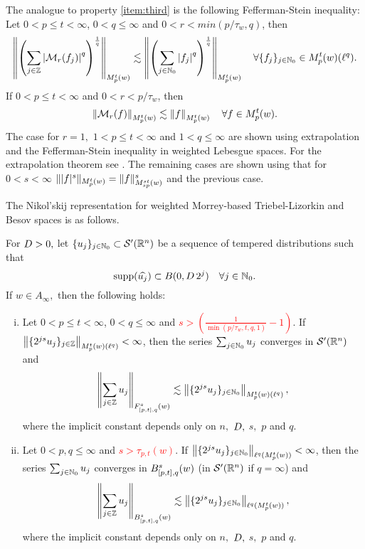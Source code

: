{{{{{{The analogue to property \ref{item:third} is the following Fefferman-Stein inequality:
Let $0<p\leq t<\infty$, $0<q\leq\infty$ and $0<r<min(p/\tau_w,q)$, then
\begin{equation}\label{eq:FTMorrey}
\norm{\left(\sum_{j\in\ent} \abs{\M_r(f_j)}^q\right)^{\frac{1}{q}}}{\mow{p}{t}{w}}\lesssim \norm{\left(\sum_{j\in\na_0} \abs{f_j}^q\right)^{\frac{1}{q}}}{\mow{p}{t}{w}}\quad \forall \{f_j\}_{j\in \na_0}\in \mow{p}{t}{w}(\ell^q).
\end{equation}
If $0<p\leq t <\infty$ and $0<r<p/\tau_w$, then 
\begin{equation*}
\norm{\M_r(f)}{\mow{p}{t}{w}}\lesssim \norm{f}{\mow{p}{t}{w}}\quad \forall f\in \mow{p}{t}{w}. 
\end{equation*}
The case for $r=1,$ $1<p\le t<\infty$ and $1<q\le \infty$ are shown using extrapolation and the Fefferman-Stein inequality in weighted Lebesgue spaces. For the extrapolation theorem see \cite[Theorem 5.3]{MR3538648}. The remaining cases are shown using that for $0<s<\infty$ $\| |f|^s \|_{\mow{p}{t}{w}} = \|f\|^s_{\mow{sp}{st}{w}}$ and the previous case.

The Nikol'skij representation for weighted Morrey-based Triebel-Lizorkin and Besov spaces is as follows.
\begin{theorem}\label{thm:Nikolskij:weighted} For $\A> 0,$ let $\{u_j\}_{j \in \naz} \subset \mathcal{S}'(\rn)$ be a sequence of tempered distributions such that
\begin{equation*}
\supp(\widehat{u_j}) \subset B(0, \A\, 2^j ) \quad \forall j \in \naz.
\end{equation*}
If $w\in A_\infty,$ then the following holds:  
\begin{enumerate}[(i)]
\item\label{item:thh:Nikolskij:TL} Let $0 < p \leq t < \infty$, $0 < q \leq \infty$ and \textcolor{red}{$s > \left(\frac{1}{\min(p/\tau_w,t,q,1)} - 1 \right)$}. If $\norm{\{2^{js} u_j\}_{j\in\ent}}{\mow{p}{t}{w}(\ell^{q})} < \infty$, then the series $\sum_{j \in \naz} u_j$ converges in $\mathcal{S}'(\rn)$ and 
\begin{equation*}
\norm{\sum_{j \in \ent} u_j}{\itlw{[p,t]}{s}{q}{w}} \lesssim  \norm{\{2^{js} u_j\}_{j\in\naz}}{\mow{p}{t}{w}(\ell^{q})},
\end{equation*}
where the implicit constant depends only on $n,$ $\A,$ $s,$ $p$ and  $q.$
\item\label{item:thh:Nikolskij:B} Let $0 < p, q \leq \infty$ and \textcolor{red}{$s > \tau_{p,t}(w)$}. If $\norm{\{2^{js} u_j\}_{j\in\naz}}{\ell^{q}(\mow{p}{t}{w})} < \infty$, then the series $\sum_{j \in \naz} u_j$ converges in  $\ibesw{[p,t]}{s}{q}{w}$ (in $\mathcal{S}'(\rn)$ if $q=\infty$) and 
\begin{equation*}
\norm{\sum_{j \in \ent} u_j}{\ibesw{[p,t]}{s}{q}{w}} \lesssim  \norm{\{2^{js} u_j\}_{j\in\naz}}{\ell^{q}(\mow{p}{t}{w})},
\end{equation*}
where the implicit constant depends only on $n,$ $\A,$ $s,$ $p$ and $q.$
\end{enumerate}
\end{theorem}

}}}}}}

